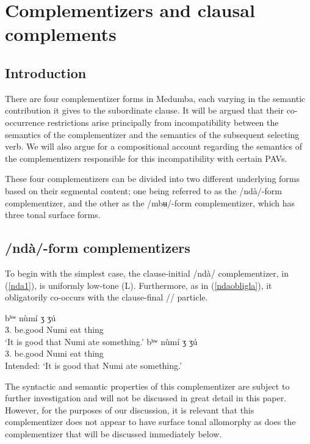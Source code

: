 \documentclass[output=paper,colorlinks,citecolor=brown]{langscibook}
\begin{document}
\section{Complementizers and clausal complements}
\subsection{Introduction}

There are four complementizer forms in Medumba, each varying in the semantic contribution it gives to the subordinate clause. It will be argued that their co-occurrence restrictions arise principally from incompatibility between the semantics of the complementizer and the semantics of the subsequent selecting verb. We will also argue for a compositional account regarding the semantics of the complementizers responsible for this incompatibility with certain PAVs.

These four complementizers can be divided into two different underlying forms based on their segmental content; one being referred to as the /nd{à}/-form complementizer, and the other as the /mbʉ/-form complementizer, which has three tonal surface forms.


\subsection{/nd{à}/-form complementizers}

To begin with the simplest case, the clause-initial /nd{à}/ complementizer, in (\ref{nda1}), is uniformly low-tone (L). Furthermore, as in (\ref{ndaobligla}), it obligatorily co-occurs with the clause-final /\la/ particle.

\ea \label{nda1}
    \begin{xlist}
    \ex \label{ndaobligla}
         {bʰʷ\ooL\ooH}     {\nda} {n{ù}m{í}} {ʒ\baruH\baruL} {ʒ{ú}} {\la} \\
             {3.} {be.good} {} {Numi} {eat} {thing} {} \\
        \glt `It is good that Numi ate something.'
    \ex
         {bʰʷ\ooL\ooH} {\nda} {n{ù}m{í}} {ʒ\baruH\baruL} {ʒ{ú}} \\
             {3.} {be.good} {} {Numi} {eat} {thing} \\
        \glt Intended: `It is good that Numi ate something.'
    \end{xlist}
\z

The syntactic and semantic properties of this complementizer are subject to further investigation and will not be discussed in great detail in this paper. However, for the purposes of our discussion, it is relevant that this complementizer does not appear to have surface tonal allomorphy as does the complementizer that will be discussed immediately below.
\end{document}

